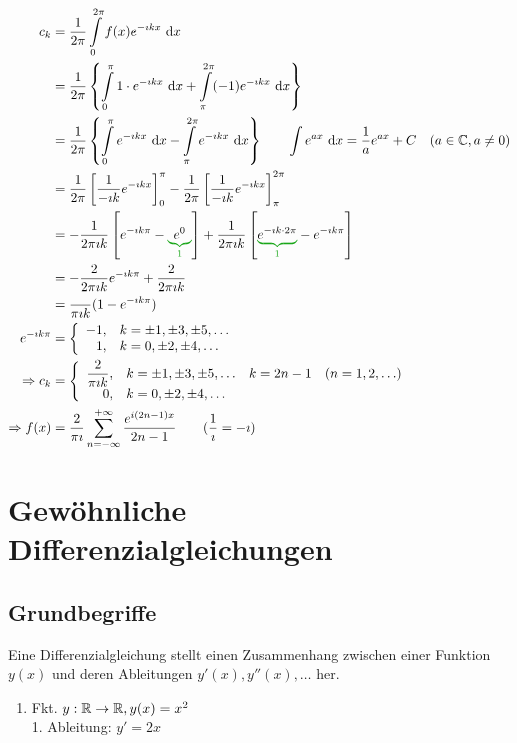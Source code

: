 \begin{align*}
c_k&=\dfrac{1}{2\pi}\int\limits_{0}^{2\pi}f(x)e^{-\i kx}\intd{x}\\
&=\dfrac{1}{2\pi}\left\{\int\limits_{0}^{\pi}1\cdot e^{-\i kx}\intd{x}+\int\limits_{\pi}^{2\pi}(-1)e^{-\i kx}\intd{x}\right\}\\
&=\dfrac{1}{2\pi}\left\{\int\limits_{0}^{\pi}e^{-\i kx}\intd{x}-\int\limits_{\pi}^{2\pi}e^{-\i kx}\intd{x}\right\}\qquad\int e^{ax}\intd{x}=\frac{1}{a}e^{ax}+C\quad(a\in\C,a\ne0)\\
&=\dfrac{1}{2\pi}\left[\dfrac{1}{-\i k}e^{-\i kx}\right]_{0}^{\pi}-\dfrac{1}{2\pi}\left[\dfrac{1}{-\i k}e^{-\i kx}\right]_{\pi}^{2\pi}\\
&=-\dfrac{1}{2\pi\i k}\left[e^{-\i k\pi}-\greenunderbrace{e^0}{1}\right]+\dfrac{1}{2\pi\i k}\left[\greenunderbrace{e^{-\i k\cdot2\pi}}{1}-e^{-\i k\pi}\right]\\
&=-\dfrac{2}{2\pi\i k}e^{-\i k\pi}+\dfrac{2}{2\pi\i k}\\
&=\dfrac{}{\pi\i k}(1-e^{-\i k\pi})\\
e^{-\i k\pi}&=\left\{\begin{array}{rl}
-1,&k=\pm1,\pm3,\pm5,\ldots\\
1,&k=0,\pm2,\pm4,\ldots
\end{array}\right.\\
\Rightarrow c_k&=\left\{\begin{array}{rlc}
\dfrac{2}{\pi\i k},&k=\pm1,\pm3,\pm5,\ldots&k=2n-1\quad(n=1,2,\ldots)\\
0,&k=0,\pm2,\pm4,\ldots
\end{array}\right.\\
\Rightarrow f(x)&=\dfrac{2}{\pi\i}\sum\limits_{n=-\infty}^{+\infty}\dfrac{e^{i(2n-1)x}}{2n-1}\qquad(\frac{1}{\i}=-\i)
\end{align*}

\clearpage
\chapter{Gewöhnliche Differenzialgleichungen}
\section{Grundbegriffe}
Eine Differenzialgleichung stellt einen Zusammenhang zwischen einer Funktion $y(x)$ und deren Ableitungen $y'(x),y''(x),\ldots$ her.

\Bsp\quad
\begin{enumerate}
	\item Fkt. $y:\mathbb{R}\to\mathbb{R},y(x)=x^2$\\
	1. Ableitung: $y'=2x$
\end{enumerate}

